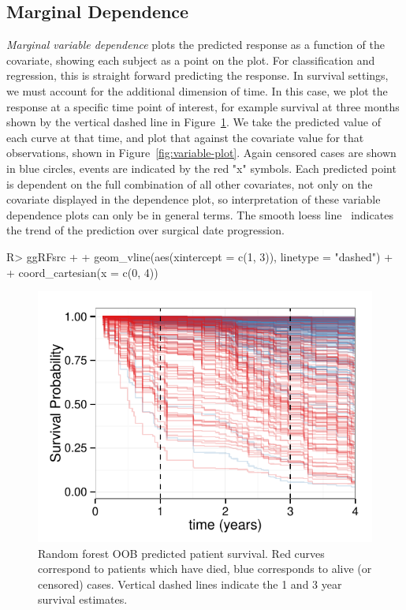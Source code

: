 \documentclass[nojss]{jss}
\begin{document}
\subsection{Marginal Dependence}\label{S:variableDependence}
\emph{Marginal variable dependence} plots the predicted response as a function of the covariate, showing each subject as a point on the plot. For classification and regression, this is straight forward predicting the response. In survival settings, we must account for the additional dimension of time. In this case, we plot the response at a specific time point of interest, for example survival at three months shown by the vertical dashed line in Figure~\ref{fig:rfsrc-plot3Mnth}. We take the predicted value of each curve at that time, and plot that against the covariate value for that observations, shown in Figure~\ref{fig:variable-plot}. Again censored cases are shown in blue circles, events are indicated by the red "x" symbols. Each predicted point is dependent on the full combination of all other covariates, not only on the covariate displayed in the dependence plot, so interpretation of these variable dependence plots can only be in general terms. The smooth loess line~\citep{cleveland:1981, cleveland:1988} indicates the trend of the prediction over surgical date progression.

\begin{Schunk}
\begin{Sinput}
R> ggRFsrc + 
+   geom_vline(aes(xintercept = c(1, 3)), linetype = "dashed") + 
+   coord_cartesian(x = c(0, 4))
\end{Sinput}
\begin{figure}[!htpb]

{\centering \includegraphics[width=\maxwidth]{figure/rfs-rfsrc-plot3Mnth-1} 

}

\caption[Random forest OOB predicted patient survival]{Random forest OOB predicted patient survival. Red curves correspond to patients which have died, blue corresponds to alive (or censored) cases. Vertical dashed lines indicate the 1 and 3 year survival estimates.\label{fig:rfsrc-plot3Mnth}}
\end{figure}
\end{Schunk}
\end{document}
